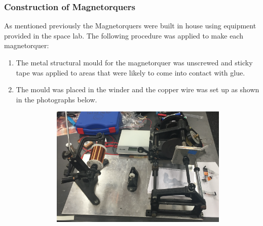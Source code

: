 \subsubsection{Construction of Magnetorquers}
As mentioned previously the Magnetorquers were built in house using equipment provided in the space lab.  The following procedure was applied to make each magnetorquer:
\begin{enumerate}
    \item The metal structural mould for the magnetorquer was unscrewed and sticky tape was applied to areas that were likely to come into contact with glue.
    \item The mould was placed in the winder and the copper wire was set up as shown in the photographs below.
    \begin{center}
        \begin{figure}[H]
            \caption{Magnetorquer Construction Set Up}
            \begin{subfigure}{0.5\textwidth}
                \includegraphics[scale = 0.35]{./figures/Construction_1}
            \end{subfigure}
            \hspace{15mm}
            \begin{subfigure}{0.5\textwidth}

\end{subfigure}
\end{figure}
\end{center}
\end{enumerate}
